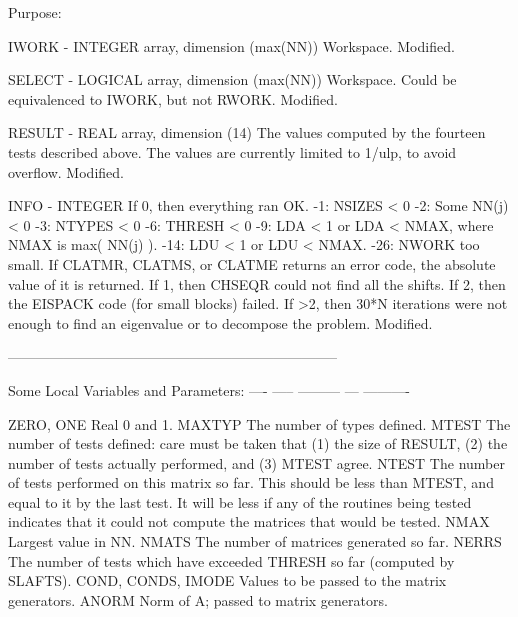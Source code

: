 \begin{DoxyParagraph}{Purpose\+: }
\begin{DoxyVerb}
  IWORK  - INTEGER array, dimension (max(NN))
           Workspace.
           Modified.

  SELECT - LOGICAL array, dimension (max(NN))
           Workspace.  Could be equivalenced to IWORK, but not RWORK.
           Modified.

  RESULT - REAL array, dimension (14)
           The values computed by the fourteen tests described above.
           The values are currently limited to 1/ulp, to avoid
           overflow.
           Modified.

  INFO   - INTEGER
           If 0, then everything ran OK.
            -1: NSIZES < 0
            -2: Some NN(j) < 0
            -3: NTYPES < 0
            -6: THRESH < 0
            -9: LDA < 1 or LDA < NMAX, where NMAX is max( NN(j) ).
           -14: LDU < 1 or LDU < NMAX.
           -26: NWORK too small.
           If  CLATMR, CLATMS, or CLATME returns an error code, the
               absolute value of it is returned.
           If 1, then CHSEQR could not find all the shifts.
           If 2, then the EISPACK code (for small blocks) failed.
           If >2, then 30*N iterations were not enough to find an
               eigenvalue or to decompose the problem.
           Modified.

-----------------------------------------------------------------------

     Some Local Variables and Parameters:
     ---- ----- --------- --- ----------

     ZERO, ONE       Real 0 and 1.
     MAXTYP          The number of types defined.
     MTEST           The number of tests defined: care must be taken
                     that (1) the size of RESULT, (2) the number of
                     tests actually performed, and (3) MTEST agree.
     NTEST           The number of tests performed on this matrix
                     so far.  This should be less than MTEST, and
                     equal to it by the last test.  It will be less
                     if any of the routines being tested indicates
                     that it could not compute the matrices that
                     would be tested.
     NMAX            Largest value in NN.
     NMATS           The number of matrices generated so far.
     NERRS           The number of tests which have exceeded THRESH
                     so far (computed by SLAFTS).
     COND, CONDS,
     IMODE           Values to be passed to the matrix generators.
     ANORM           Norm of A; passed to matrix generators.


\end{DoxyVerb}
\end{DoxyParagraph}
